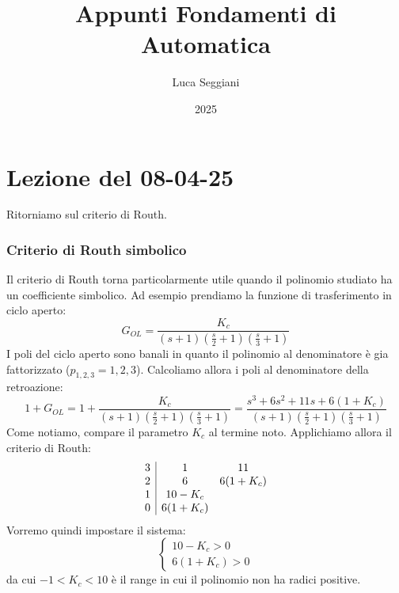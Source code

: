 \documentclass[a4paper,11pt]{article}
\title{Appunti Fondamenti di Automatica}
\author{Luca Seggiani}
\date{2025}
\begin{document}
\section{Lezione del 08-04-25}

\thispagestyle{empty}
\pagestyle{fancy}

Ritorniamo sul criterio di Routh.

\subsubsection{Criterio di Routh simbolico}
Il criterio di Routh torna particolarmente utile quando il polinomio studiato ha un coefficiente simbolico.
Ad esempio prendiamo la funzione di trasferimento in ciclo aperto:
$$
G_{OL} = \frac{K_c}{(s + 1)(\frac{s}{2} + 1)(\frac{s}{3} + 1)}
$$
I poli del ciclo aperto sono banali in quanto il polinomio al denominatore è gia fattorizzato ($p_{1,2,3} = 1,2,3$).
Calcoliamo allora i poli al denominatore della retroazione:
$$
1 + G_{OL} = 1 + \frac{K_c}{(s + 1)(\frac{s}{2} + 1)(\frac{s}{3} + 1)} = 
\frac{ s^3 + 6 s^2 + 11s + 6 ( 1 + K_c ) }{ (s + 1)(\frac{s}{2} + 1)(\frac{s}{3} + 1) } 
$$
Come notiamo, compare il parametro $K_c$ al termine noto.
Applichiamo allora il criterio di Routh:
$$
\begin{array}{c | c c}
		3 & 1 & 11 \\
		2 & 6 & 6(1 + K_c) \\
		1 & 10 - K_c \\
		0 & 6(1 + K_c)
\end{array}
$$
Vorremo quindi impostare il sistema:
\[
	\begin{cases}
		10 - K_c > 0 \\
		6(1 + K_c) > 0
	\end{cases}
\]
da cui $-1 < K_c < 10$ è il range in cui il polinomio non ha radici positive.

\par\medskip
\end{document}
